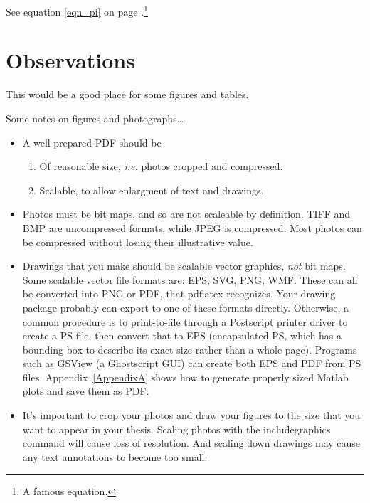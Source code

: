 \documentclass[letterpaper,12pt,titlepage,oneside,final]{report}
\begin{document}
See equation \ref{eqn_pi} on page \pageref{eqn_pi}.\footnote{A famous equation.}

\chapter{Observations}

This would be a good place for some figures and tables.

Some notes on figures and photographs\ldots

\begin{itemize}
\item A well-prepared PDF should be 
  \begin{enumerate}
  \item Of reasonable size, {\it i.e.} photos cropped and compressed.
  \item Scalable, to allow enlargment of text and drawings. 
  \end{enumerate} 
\item Photos must be bit maps, and so are not scaleable by definition. TIFF and
  BMP are uncompressed formats, while JPEG is compressed. Most photos can be
  compressed without losing their illustrative value.
\item Drawings that you make should be scalable vector graphics, \emph{not} 
  bit maps. Some scalable vector file formats are: EPS, SVG, PNG, WMF. These can
  all be converted into PNG or PDF, that pdflatex recognizes. Your drawing 
  package probably can export to one of these formats directly. Otherwise, a 
  common procedure is to print-to-file through a Postscript printer driver to 
  create a PS file, then convert that to EPS (encapsulated PS, which has a 
  bounding box to describe its exact size rather than a whole page). 
  Programs such as GSView (a Ghostscript GUI) can create both EPS and PDF from PS files.
  Appendix~\ref{AppendixA} shows how to generate properly sized Matlab plots and save them as PDF.
\item It's important to crop your photos and draw your figures to the size that
  you want to appear in your thesis. Scaling photos with the 
  includegraphics command will cause loss of resolution. And scaling down 
  drawings may cause any text annotations to become too small.
\end{itemize}
\end{document}
